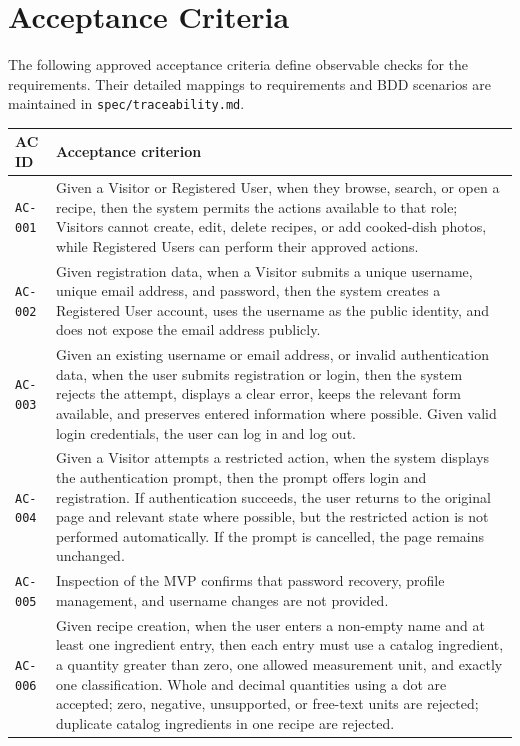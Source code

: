 \documentclass[12pt]{article}
\begin{document}
\section{Acceptance Criteria}

The following approved acceptance criteria define observable checks for the requirements. Their detailed mappings to requirements and BDD scenarios are maintained in \texttt{spec/traceability.md}.

\begin{longtable}{p{} p{}}
\textbf{AC ID} & \textbf{Acceptance criterion} \\
\hline
\texttt{AC-001} & Given a Visitor or Registered User, when they browse, search, or open a recipe, then the system permits the actions available to that role; Visitors cannot create, edit, delete recipes, or add cooked-dish photos, while Registered Users can perform their approved actions. \\
\texttt{AC-002} & Given registration data, when a Visitor submits a unique username, unique email address, and password, then the system creates a Registered User account, uses the username as the public identity, and does not expose the email address publicly. \\
\texttt{AC-003} & Given an existing username or email address, or invalid authentication data, when the user submits registration or login, then the system rejects the attempt, displays a clear error, keeps the relevant form available, and preserves entered information where possible. Given valid login credentials, the user can log in and log out. \\
\texttt{AC-004} & Given a Visitor attempts a restricted action, when the system displays the authentication prompt, then the prompt offers login and registration. If authentication succeeds, the user returns to the original page and relevant state where possible, but the restricted action is not performed automatically. If the prompt is cancelled, the page remains unchanged. \\
\texttt{AC-005} & Inspection of the MVP confirms that password recovery, profile management, and username changes are not provided. \\
\texttt{AC-006} & Given recipe creation, when the user enters a non-empty name and at least one ingredient entry, then each entry must use a catalog ingredient, a quantity greater than zero, one allowed measurement unit, and exactly one classification. Whole and decimal quantities using a dot are accepted; zero, negative, unsupported, or free-text units are rejected; duplicate catalog ingredients in one recipe are rejected. \\

\end{longtable}
\end{document}
